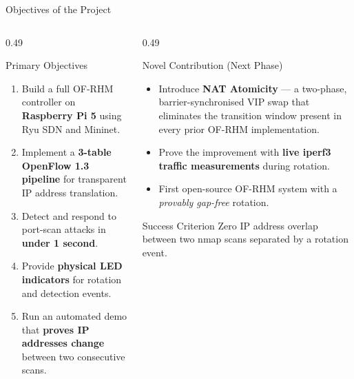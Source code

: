 \documentclass[aspectratio=169,10pt]{beamer}
\begin{document}
\begin{frame}{Objectives of the Project}
  \begin{columns}[T]
    \begin{column}{0.49\textwidth}
      \begin{block}{Primary Objectives}
        \begin{enumerate}\small\setlength\itemsep{5pt}
          \item Build a full OF-RHM controller on \textbf{Raspberry Pi 5} using Ryu SDN and Mininet.
          \item Implement a \textbf{3-table OpenFlow 1.3 pipeline} for transparent IP address translation.
          \item Detect and respond to port-scan attacks in \textbf{under 1 second}.
          \item Provide \textbf{physical LED indicators} for rotation and detection events.
          \item Run an automated demo that \textbf{proves IP addresses change} between two consecutive scans.
        \end{enumerate}
      \end{block}
    \end{column}
    \begin{column}{0.49\textwidth}
      \begin{exampleblock}{Novel Contribution (Next Phase)}
        \begin{itemize}\small\setlength\itemsep{5pt}
          \item Introduce \textbf{NAT Atomicity} --- a two-phase, barrier-synchronised VIP swap that eliminates the transition window present in every prior OF-RHM implementation.
          \item Prove the improvement with \textbf{live iperf3 traffic measurements} during rotation.
          \item First open-source OF-RHM system with a \emph{provably gap-free} rotation.
        \end{itemize}
      \end{exampleblock}
      \vspace{0.2cm}
      \begin{alertblock}{Success Criterion}
        \small\centering Zero IP address overlap between two nmap scans separated by a rotation event.
      \end{alertblock}
    \end{column}
  \end{columns}
\end{frame}
\end{document}
